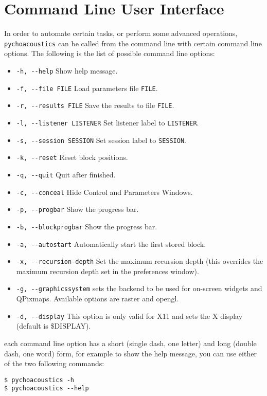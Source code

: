 

\chapter{Command Line User Interface}
In order to automate certain tasks, or perform some advanced operations, \texttt{pychoacoustics} can be called from the command line with certain command line options. The following is the list of possible command line options:
\begin{itemize}
\item \verb+-h, --help+ Show help message.
\item \verb+-f, --file FILE+ Load parameters file \texttt{FILE}.
\item \verb+-r, --results FILE+  Save the results to file \texttt{FILE}.
\item \verb+-l, --listener LISTENER+ Set listener label to \texttt{LISTENER}.
\item \verb+-s, --session SESSION+ Set session label to \texttt{SESSION}.
\item \verb+-k, --reset+ Reset block positions.
\item \verb+-q, --quit+ Quit after finished.
\item \verb+-c, --conceal+ Hide Control and Parameters Windows.
\item \verb+-p, --progbar+ Show the progress bar.
\item \verb+-b, --blockprogbar+ Show the progress bar.
\item \verb+-a, --autostart+ Automatically start the first stored block.
\item \verb+-x, --recursion-depth+ Set the maximum recursion depth (this overrides the maximum recursion depth set in the preferences window).
\item \verb+-g, --graphicssystem+ sets the backend to be used for on-screen widgets and QPixmaps. Available options are raster and opengl.
\item \verb+-d, --display+ This option is only valid for X11 and sets the X display (default is \$DISPLAY).
\end{itemize}
each command line option has a short (single dash, one letter) and long (double dash, one word) form, for example to show the help message, you can use either of the two following commands:
\begin{verbatim}
$ pychoacoustics -h
$ pychoacoustics --help
\end{verbatim}



